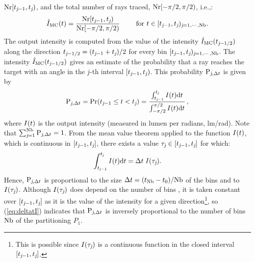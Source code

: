 $\textrm{Nr}[t_{\textit{j}-1},t_{\textit{j}})$, and the total number of rays traced, $\textrm{Nr}[-\pi/2, \pi/2)$, i.e.,:
\begin{equation} \label{g_mc}
\hat{I}_{\textrm{MC}}(t) = \frac{\textrm{Nr}[t_{\textit{j}-1},t_{\textit{j}})}{\textrm{Nr}[-\pi/2, \pi/2)} \qquad \mbox{ for } t\in[t_{\textit{j}-1}, t_{\textit{j}})_{\textit{j}=1, \cdots, \textrm{Nb}}.
\end{equation}
The output intensity is computed from the value of the intensity $\hat{I}_{\textrm{MC}}(t_{\textit{j}-1/2})$ along the direction $t_{\textit{j}-1/2}=(t_{\textit{j}-1}+
t_{\textit{j}})/2$ for every bin $[t_{\textit{j}-1},t_{\textit{j}})_{\textit{j} = 1, \cdots, \textrm{Nb}}$.
 The intensity $\hat{I}_{\textrm{MC}}(t_{\textit{j}-1/2})$ gives an estimate of the probability that a ray reaches the target with an angle in the $\textit{j}$-th interval
$[t_{\textit{j}-1}, t_{\textit{j}})$. This probability $\textrm{P}_{\textit{j}, \Delta t}$ is given by
\begin{equation}\label{eq:probability}
\textrm{P}_{\textit{j}, \Delta t} = \Pr(t_{\textit{j}-1}\leq t<t_{\textit{j}})=
\frac{\int_{t_{\textit{j}-1}}^{t_{\textit{j}}} I(t) \textrm{d}t}{\int_{-\pi/2}^{\pi/2}I(t) \textrm{d}t}\,,
\end{equation}
where $I(t)$ is the output intensity (measured in lumen per radians, \textrm{lm}/\textrm{rad}).
Note that $\sum_{\textit{j}=1}^{\textrm{Nb}}\textrm{P}_{\textit{j}, \Delta t}=1$. From the mean value theorem applied to the function
$I(t)$, which is continuous in $[t_{\textit{j}-1}, t_{\textit{j}}]$, there exists a value $\tau_{\textit{j}}\in[t_{\textit{j}-1}, t_{\textit{j}}]$ for which:
 \begin{equation}\label{eq:deltatI}
\int_{t_{\textit{j}-1}}^{t_{\textit{j}}} I(t) \textrm{d}t = \Delta t\;I(\tau_{\textit{j}}).
\end{equation}
Hence, $\textrm{P}_{\textit{j}, \Delta t}$ is proportional to the size $\Delta t= (t_{\textrm{Nb}}-t_{0})/{\textrm{Nb}}$
of the bins and to $I(\tau_{\textit{j}})$. Although $I(\tau_{\textit{j}})$ does depend on the number of bins \nbin, it is taken constant over $[t_{\textit{j}-1}, t_{\textit{j}}]$ as it is the value of the intensity for a given direction\footnote{This is possible since $I(\tau_{\textit{j}})$ is a continuous function in the closed interval $[t_{\textit{j}-1}, t_{\textit{j}}]$.}, so (\ref{eq:deltatI}) indicates that $\textrm{P}_{\textit{j}, \Delta t}$ is inversely proportional to the number of bins $\textrm{Nb}$ of the partitioning $P_1$.

